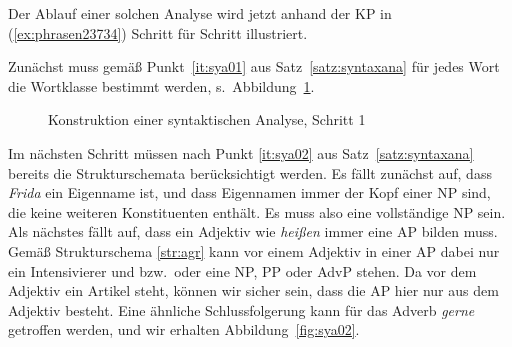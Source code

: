 
Der Ablauf einer solchen Analyse wird jetzt anhand der KP in (\ref{ex:phrasen23734}) Schritt für Schritt illustriert.

\begin{exe}
\end{exe}

Zunächst muss gemäß Punkt~\ref{it:sya01} aus Satz~\ref{satz:syntaxana} für jedes Wort die Wortklasse bestimmt werden, s.\ Abbildung~\ref{fig:sya01}.

\begin{figure}
  \caption{Konstruktion einer syntaktischen Analyse, Schritt 1}
  \label{fig:sya01}
\end{figure}

Im nächsten Schritt müssen nach Punkt \ref{it:sya02} aus Satz~\ref{satz:syntaxana} bereits die Strukturschemata berücksichtigt werden.
Es fällt zunächst auf, dass \textit{Frida} ein Eigenname ist, und dass Eigennamen immer der Kopf einer NP sind, die keine weiteren Konstituenten enthält.
Es muss also eine vollständige NP sein.
Als nächstes fällt auf, dass ein Adjektiv wie \textit{heißen} immer eine AP bilden muss.
Gemäß Strukturschema \ref{str:agr} kann vor einem Adjektiv in einer AP dabei nur ein Intensivierer und bzw.\ oder eine NP, PP oder AdvP stehen.
Da vor dem Adjektiv ein Artikel steht, können wir sicher sein, dass die AP hier nur aus dem Adjektiv besteht.
Eine ähnliche Schlussfolgerung kann für das Adverb \textit{gerne} getroffen werden, und wir erhalten Abbildung~\ref{fig:sya02}.

